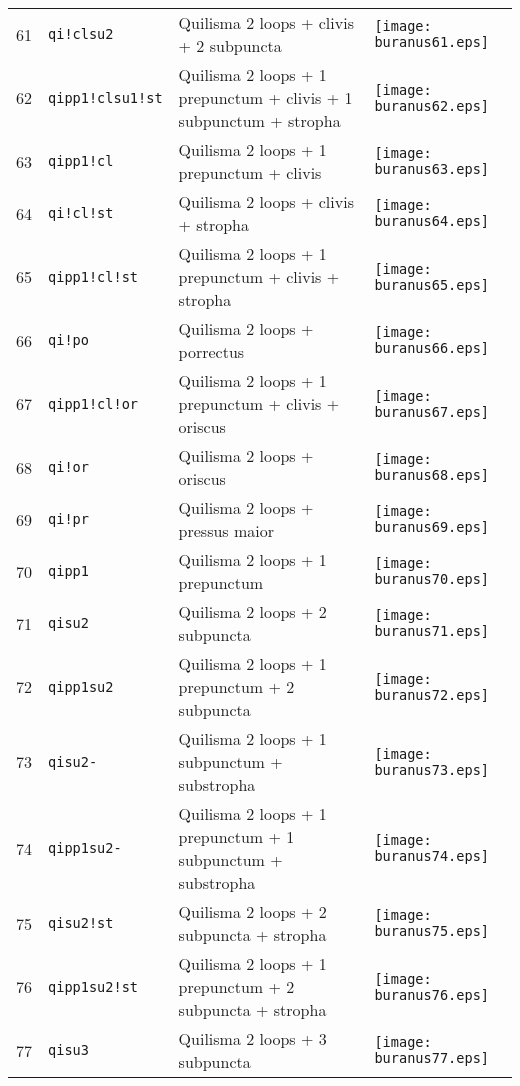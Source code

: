 \documentclass{scrarticle}
\begin{document}
\begin{longtable}{l|l|l|l}
61 & \texttt{qi!clsu2} & Quilisma 2 loops + clivis + 2 subpuncta & \texttt{[image: buranus61.eps]} \\
62 & \texttt{qipp1!clsu1!st} & Quilisma 2 loops + 1 prepunctum + clivis + 1 subpunctum + stropha & \texttt{[image: buranus62.eps]} \\
63 & \texttt{qipp1!cl} & Quilisma 2 loops + 1 prepunctum + clivis & \texttt{[image: buranus63.eps]} \\
64 & \texttt{qi!cl!st} & Quilisma 2 loops + clivis + stropha & \texttt{[image: buranus64.eps]} \\
65 & \texttt{qipp1!cl!st} & Quilisma 2 loops + 1 prepunctum + clivis + stropha & \texttt{[image: buranus65.eps]} \\
66 & \texttt{qi!po} & Quilisma 2 loops + porrectus & \texttt{[image: buranus66.eps]} \\
67 & \texttt{qipp1!cl!or} & Quilisma 2 loops + 1 prepunctum + clivis + oriscus & \texttt{[image: buranus67.eps]} \\
68 & \texttt{qi!or} & Quilisma 2 loops + oriscus & \texttt{[image: buranus68.eps]} \\
69 & \texttt{qi!pr} & Quilisma 2 loops + pressus maior & \texttt{[image: buranus69.eps]} \\
70 & \texttt{qipp1} & Quilisma 2 loops + 1 prepunctum & \texttt{[image: buranus70.eps]} \\
71 & \texttt{qisu2} & Quilisma 2 loops + 2 subpuncta & \texttt{[image: buranus71.eps]} \\
72 & \texttt{qipp1su2} & Quilisma 2 loops + 1 prepunctum + 2 subpuncta & \texttt{[image: buranus72.eps]} \\
73 & \texttt{qisu2-} & Quilisma 2 loops + 1 subpunctum + substropha & \texttt{[image: buranus73.eps]} \\
74 & \texttt{qipp1su2-} & Quilisma 2 loops + 1 prepunctum + 1 subpunctum + substropha & \texttt{[image: buranus74.eps]} \\
75 & \texttt{qisu2!st} & Quilisma 2 loops + 2 subpuncta + stropha & \texttt{[image: buranus75.eps]} \\
76 & \texttt{qipp1su2!st} & Quilisma 2 loops + 1 prepunctum + 2 subpuncta + stropha & \texttt{[image: buranus76.eps]} \\
77 & \texttt{qisu3} & Quilisma 2 loops + 3 subpuncta & \texttt{[image: buranus77.eps]} \\

\end{longtable}
\end{document}
